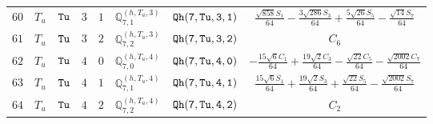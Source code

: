 \documentclass[fleqn,8pt]{jsarticle}
\begin{document}
\begin{table}[ht!]
\begin{center}
\begin{tabular}{cccccccc}
$ 60 $ & $ T_{u} $ & $ {\tt Tu} $ & $ 3 $ & $ 1 $ & $ \mathbb{Q}_{7,1}^{(h,T_{u},3)} $ & $ {\tt Qh(7,Tu,3,1)} $ & $ \frac{\sqrt{858} S_{1}}{64} - \frac{3 \sqrt{286} S_{3}}{64} + \frac{5 \sqrt{26} S_{5}}{64} - \frac{\sqrt{14} S_{7}}{64} $ \\
$ 61 $ & $ T_{u} $ & $ {\tt Tu} $ & $ 3 $ & $ 2 $ & $ \mathbb{Q}_{7,2}^{(h,T_{u},3)} $ & $ {\tt Qh(7,Tu,3,2)} $ & $ C_{6} $ \\
$ 62 $ & $ T_{u} $ & $ {\tt Tu} $ & $ 4 $ & $ 0 $ & $ \mathbb{Q}_{7,0}^{(h,T_{u},4)} $ & $ {\tt Qh(7,Tu,4,0)} $ & $ - \frac{15 \sqrt{6} C_{1}}{64} + \frac{19 \sqrt{2} C_{3}}{64} - \frac{\sqrt{22} C_{5}}{64} - \frac{\sqrt{2002} C_{7}}{64} $ \\
$ 63 $ & $ T_{u} $ & $ {\tt Tu} $ & $ 4 $ & $ 1 $ & $ \mathbb{Q}_{7,1}^{(h,T_{u},4)} $ & $ {\tt Qh(7,Tu,4,1)} $ & $ \frac{15 \sqrt{6} S_{1}}{64} + \frac{19 \sqrt{2} S_{3}}{64} + \frac{\sqrt{22} S_{5}}{64} - \frac{\sqrt{2002} S_{7}}{64} $ \\
$ 64 $ & $ T_{u} $ & $ {\tt Tu} $ & $ 4 $ & $ 2 $ & $ \mathbb{Q}_{7,2}^{(h,T_{u},4)} $ & $ {\tt Qh(7,Tu,4,2)} $ & $ C_{2} $ \\
 \hline \hline
\end{tabular}
\end{center}
\end{table}
\end{document}
